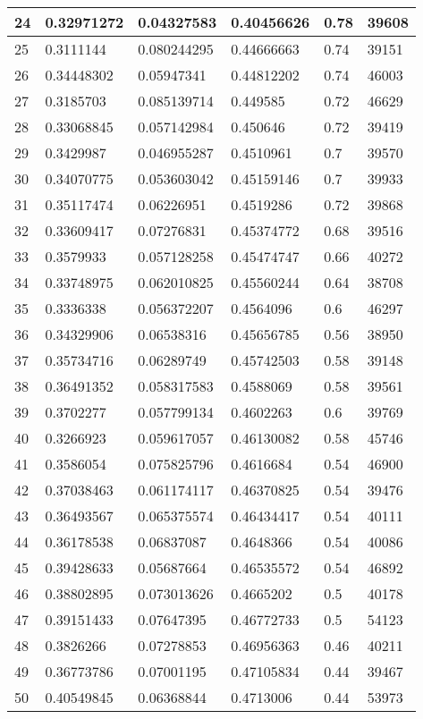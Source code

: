 \begin{longtable}{|l|l|l|l|l|l|}
24 & 0.32971272 & 0.04327583 & 0.40456626 & 0.78 & 39608 \\ \hline 
25 & 0.3111144 & 0.080244295 & 0.44666663 & 0.74 & 39151 \\ \hline 
26 & 0.34448302 & 0.05947341 & 0.44812202 & 0.74 & 46003 \\ \hline 
27 & 0.3185703 & 0.085139714 & 0.449585 & 0.72 & 46629 \\ \hline 
28 & 0.33068845 & 0.057142984 & 0.450646 & 0.72 & 39419 \\ \hline 
29 & 0.3429987 & 0.046955287 & 0.4510961 & 0.7 & 39570 \\ \hline 
30 & 0.34070775 & 0.053603042 & 0.45159146 & 0.7 & 39933 \\ \hline 
31 & 0.35117474 & 0.06226951 & 0.4519286 & 0.72 & 39868 \\ \hline 
32 & 0.33609417 & 0.07276831 & 0.45374772 & 0.68 & 39516 \\ \hline 
33 & 0.3579933 & 0.057128258 & 0.45474747 & 0.66 & 40272 \\ \hline 
34 & 0.33748975 & 0.062010825 & 0.45560244 & 0.64 & 38708 \\ \hline 
35 & 0.3336338 & 0.056372207 & 0.4564096 & 0.6 & 46297 \\ \hline 
36 & 0.34329906 & 0.06538316 & 0.45656785 & 0.56 & 38950 \\ \hline 
37 & 0.35734716 & 0.06289749 & 0.45742503 & 0.58 & 39148 \\ \hline 
38 & 0.36491352 & 0.058317583 & 0.4588069 & 0.58 & 39561 \\ \hline 
39 & 0.3702277 & 0.057799134 & 0.4602263 & 0.6 & 39769 \\ \hline 
40 & 0.3266923 & 0.059617057 & 0.46130082 & 0.58 & 45746 \\ \hline 
41 & 0.3586054 & 0.075825796 & 0.4616684 & 0.54 & 46900 \\ \hline 
42 & 0.37038463 & 0.061174117 & 0.46370825 & 0.54 & 39476 \\ \hline 
43 & 0.36493567 & 0.065375574 & 0.46434417 & 0.54 & 40111 \\ \hline 
44 & 0.36178538 & 0.06837087 & 0.4648366 & 0.54 & 40086 \\ \hline 
45 & 0.39428633 & 0.05687664 & 0.46535572 & 0.54 & 46892 \\ \hline 
46 & 0.38802895 & 0.073013626 & 0.4665202 & 0.5 & 40178 \\ \hline 
47 & 0.39151433 & 0.07647395 & 0.46772733 & 0.5 & 54123 \\ \hline 
48 & 0.3826266 & 0.07278853 & 0.46956363 & 0.46 & 40211 \\ \hline 
49 & 0.36773786 & 0.07001195 & 0.47105834 & 0.44 & 39467 \\ \hline 
50 & 0.40549845 & 0.06368844 & 0.4713006 & 0.44 & 53973 \\ \hline 
\end{longtable}